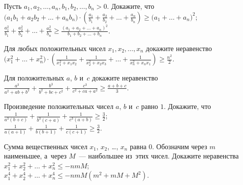 \begin{problems}

\item
Пусть $a_{1}, a_{2}, \ldots, a_{n}, b_{1}, b_{2}, \ldots, b_{n} > 0$.
Докажите, что
\\[0.5ex]
\subproblem
\( \displaystyle
    \bigl( a_{1} b_{1} + a_{2} b_{2} + \ldots + a_{n} b_{n} \bigr)
    \cdot
    \left(
        \frac{a_{1}}{b_{1}} + \frac{a_{2}}{b_{2}} +
        \ldots +
        \frac{a_{n}}{b_{n}}
    \right)
\geq
    \bigl( a_{1} + \ldots + a_{n} \bigr)^2
\);
\\[1.0ex]
\subproblem
\( \displaystyle
    \frac{a_{1}^2}{b_{1}} + \frac{a_{2}^2}{b_{2}} +
    \ldots + \frac{a_{n}^2}{b_{n}}
\geq
    \frac{(a_{1} + a_{2} + \ldots + a_{n})^2}{b_{1} + b_{2} + \ldots + b_{n}}
\).

\item
Для любых положительных чисел $x_{1}, x_{2}, \ldots, x_{n}$ докажите
неравенство
\\[0.5ex]
\( \displaystyle
    \bigl( x_{1}^2 + \ldots + x_{n}^2 \bigr)
    \cdot
    \left(
        \frac{1}{x_{1}^2 + x_{1} x_{2}} +
        \frac{1}{x_{2}^2 + x_{2} x_{3}} +
        \ldots +
        \frac{1}{x_{n}^2 + x_{n} x_{1}}
    \right)
\geq
    \frac{n^2}{2}
\).

\item
Для положительных $a$, $b$ и~$c$ докажите неравенство
\\[0.5ex]
\( \displaystyle
    \frac{a^3}{a^2 + a b + b^2} +
    \frac{b^3}{b^2 + b c + c^2} +
    \frac{c^3}{c^2 + c a + a^2}
\geq
    \frac{a+b+c}{3}
\).


\item
Произведение положительных чисел $a$, $b$ и~$c$ равно $1$.
Докажите, что
\\[0.5ex]
\subproblem
\( \displaystyle
    \frac{1}{a^3 (b + c)} + \frac{1}{b^3 (c + a)} + \frac{1}{c^3 (a + b)}
\geq
    \frac{3}{2}
\);
\\[1.0ex]
\subproblem
\( \displaystyle
    \frac{1}{a (a + 1)} + \frac{1}{b (b + 1)} + \frac{1}{c (c + 1)}
\geq
    \frac{3}{2}
\).

\item
Сумма вещественных чисел $x_{1}$, $x_{2}$, \ldots, $x_{n}$ равна $0$.
Обозначим через $m$ наименьшее, а~через $M$~--- наибольшее из~этих чисел.
Докажите неравенства
\\[0.5ex]
\subproblem
\( \displaystyle
    x_{1}^2 + x_{2}^2 + \ldots + x_{n}^2
\leq
    - n m M
\);
\\[1.0ex]
\subproblem
\( \displaystyle
    x_{1}^4 + x_{2}^4 + \ldots + x_{n}^4
\leq
    - n m M (m^2 + m M + M^2)
\).

\end{problems}

